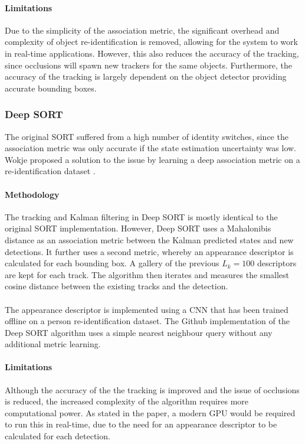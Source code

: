 \paragraph{Limitations}
Due to the simplicity of the association metric, the significant overhead and complexity of object re-identification is removed, allowing for the system to work in real-time applications. However, this also reduces the accuracy of the tracking, since occlusions will spawn new trackers for the same objects. Furthermore, the accuracy of the tracking is largely dependent on the object detector providing accurate bounding boxes.

\subsubsection{Deep SORT}
The original SORT suffered from a high number of identity switches, since the association metric was only accurate if the state estimation uncertainty was low. Wokje proposed a solution to the issue by learning a deep association metric on a re-identification dataset \cite{Wojke2018}. 

\paragraph{Methodology} The tracking and Kalman filtering in Deep SORT is mostly identical to the original SORT implementation. However, Deep SORT uses a Mahalonibis distance as an association metric between the Kalman predicted states and new detections. It further uses a second metric, whereby an appearance descriptor is calculated for each bounding box. A gallery of the previous $L_{k} = 100$ descriptors are kept for each track. The algorithm then iterates and measures the smallest cosine distance between the existing tracks and the detection.

\paragraph{} The appearance descriptor is implemented using a CNN that has been trained offline on a person re-identification dataset. The Github implementation of the Deep SORT algorithm uses a simple nearest neighbour query without any additional metric learning.

\paragraph{Limitations}
Although the accuracy of the the tracking is improved and the issue of occlusions is reduced, the increased complexity of the algorithm requires more computational power. As stated in the paper, a modern GPU would be required to run this in real-time, due to the need for an appearance descriptor to be calculated for each detection.

